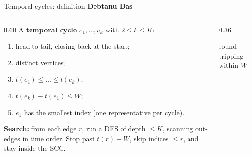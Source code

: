 \documentclass[aspectratio=169,11pt]{beamer}
\newcommand{\memberbadge}[1]{%
  \hfill{\small\bfseries\color{memberred}#1}%
}
\begin{document}
\begin{frame}{Temporal cycles: definition \memberbadge{Debtanu Das}}
\begin{columns}[T,onlytextwidth]
\begin{column}{0.60\textwidth}
A \textbf{temporal cycle} $e_1, \dots, e_k$ with $2 \le k \le K$:
\begin{enumerate}
\setlength{\itemsep}{0.25em}
\item head-to-tail, closing back at the start;
\item distinct vertices;
\item $t(e_1) \le \dots \le t(e_k)$;
\item $t(e_k) - t(e_1) \le W$;
\item $e_1$ has the smallest index (one representative per cycle).
\end{enumerate}
\vspace{0.2cm}
\textbf{Search:} from each edge $r$, run a DFS of depth $\le K$, scanning out-edges in time order. Stop past $t(r) + W$, skip indices $\le r$, and stay inside the SCC.
\end{column}
\begin{column}{0.36\textwidth}
\centering
\vspace{0.8cm}

\vspace{0.3cm}
{\footnotesize round-tripping within $W$}
\end{column}
\end{columns}
\end{frame}
\end{document}
